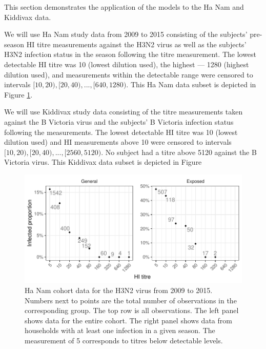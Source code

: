 This section demonstrates the application of the models to the Ha Nam and Kiddivax data.

We will use Ha Nam study data from 2009 to 2015 consisting of the subjects' pre-season HI titre measurements against the H3N2 virus as well as the subjects' H3N2 infection status in the season following the titre measurement. The lowest detectable HI titre was 10 (lowest dilution used), the highest --- 1280 (highest dilution used), and measurements within the detectable range were censored to intervals $[10, 20), [20, 40), ..., [640, 1280)$. This Ha Nam data subset is depicted in Figure \ref{fig:hanam-hi-summ-h3n2}.

We will use Kiddivax study data consisting of the titre measurements taken against the B Victoria virus and the subjects' B Victoria infection status following the measurements. The lowest detectable HI titre was 10 (lowest dilution used) and HI measurements above 10 were censored to intervals $[10, 20), [20, 40), ..., [2560, 5120)$. No subject had a titre above 5120 against the B Victoria virus. This Kiddivax data subset is depicted in Figure

\begin{figure}[htp]
    \centering
    \includegraphics[width=1\textwidth]{../data-plot/hanam-hi-summ-h3n2-light.pdf}
    \caption{
        Ha Nam cohort data for the H3N2 virus from 2009 to 2015. Numbers next to points are the total number of observations in the corresponding group. The top row is all observations. The left panel shows data for the entire cohort. The right panel shows data from households with at least one infection in a given season. The measurement of 5 corresponds to titres below detectable levels.
    }
    \label{fig:hanam-hi-summ-h3n2}
\end{figure}
